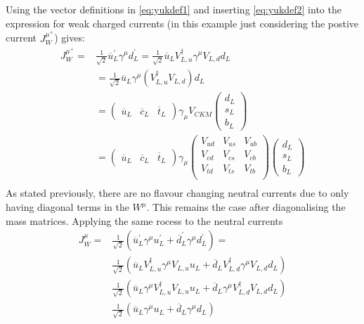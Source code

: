 Using the vector definitions in \autoref{eq:yukdef1} and inserting \autoref{eq:yukdef2} into the expression for weak charged currents (in this example just considering the postive current $J^{\mu^{+}}_{W}$) gives:
\begin{equation}
\begin{split}
  J^{\mu^{+}}_{W} =
  & \frac{1}{\sqrt{2}}\overline{u}^{\prime}_{L}\gamma^{\mu}d^{\prime}_{L} = \frac{1}{\sqrt{2}}\overline{u}_{L}V^{\dagger}_{L,u}\gamma^{\mu}V_{L,d}d_{L} \\
  & = \frac{1}{\sqrt{2}}\overline{u}_{L}\gamma^{\mu}(V^{\dagger}_{L,u}V_{L,d})d_{L} \\
  & = \begin{pmatrix}\overline{u}_{L}&\overline{c}_{L}&\overline{t}_{L}\end{pmatrix}\gamma_{\mu}V_{CKM}\begin{pmatrix}d_{L}\\s_{L}\\b_{L}\end{pmatrix} \\
  & = \begin{pmatrix}\overline{u}_{L}&\overline{c}_{L}&\overline{t}_{L}\end{pmatrix}\gamma_{\mu}\begin{pmatrix}V_{ud}&V_{us}&V_{ub}\\V_{cd}&V_{cs}&V_{cb}\\V_{td}&V_{ts}&V_{tb}\\\end{pmatrix} \begin{pmatrix}  d_{L}\\s_{L}\\b_{L}\end{pmatrix} \\
  \end{split}
\end{equation}
As stated previously, there are no flavour changing neutral currents due to only having diagonal terms in the $W^{\mu}$. This remains the case after diagonalising the mass matrices. Applying the same rocess to the neutral currents
\begin{equation}
  \begin{split}
  J^{\mu}_{W} =
  & \frac{1}{\sqrt{2}}(\overline{u}^{\prime}_{L}\gamma^{\mu}u^{\prime}_{L}  + \overline{d}^{\prime}_{L}\gamma^{\mu}d^{\prime}_{L}) = \\
  & \frac{1}{\sqrt{2}}(\overline{u}_{L}V^{\dagger}_{L,u}\gamma^{\mu}V_{L,u}u_{L}  + \overline{d}_{L}V^{\dagger}_{L,d}\gamma^{\mu}V_{L,d}d_{L}) \\
  & \frac{1}{\sqrt{2}}(\overline{u}_{L}\gamma^{\mu}V^{\dagger}_{L,u}V_{L,u}u_{L}  + \overline{d}_{L}\gamma^{\mu}V^{\dagger}_{L,d}V_{L,d}d_{L}) \\
  & \frac{1}{\sqrt{2}}(\overline{u}_{L}\gamma^{\mu}u_{L}  + \overline{d}_{L}\gamma^{\mu}d_{L}) \\
  \end{split}
\end{equation}
